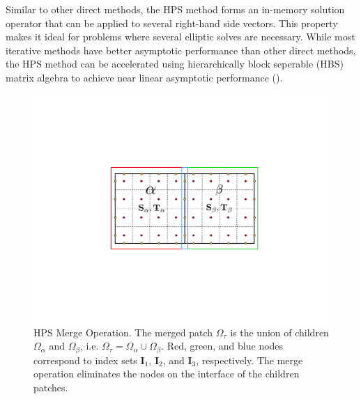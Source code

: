 Similar to other direct methods, the HPS method forms an in-memory solution operator that can be applied to several right-hand side vectors. This property makes it ideal for problems where several elliptic solves are necessary. While most iterative methods have better asymptotic performance than other direct methods, the HPS method can be accelerated using hierarchically block seperable (HBS) matrix algebra to achieve near linear asymptotic performance (\citep{gillman2014direct}).

\begin{figure}
    \centering
    \includegraphics[width=0.7\columnwidth]{figures/merge_figure.pdf}
    \caption{HPS Merge Operation. The merged patch $\Omega_{\tau}$ is the union of children $\Omega_{\alpha}$ and $\Omega_{\beta}$, i.e. $\Omega_{\tau} = \Omega_{\alpha} \cup \Omega_{\beta}$. Red, green, and blue nodes correspond to index sets $\textbf{I}_1$, $\textbf{I}_2$, and $\textbf{I}_3$, respectively. The merge operation eliminates the nodes on the interface of the children patches.}
    \label{fig:merge}
\end{figure}

